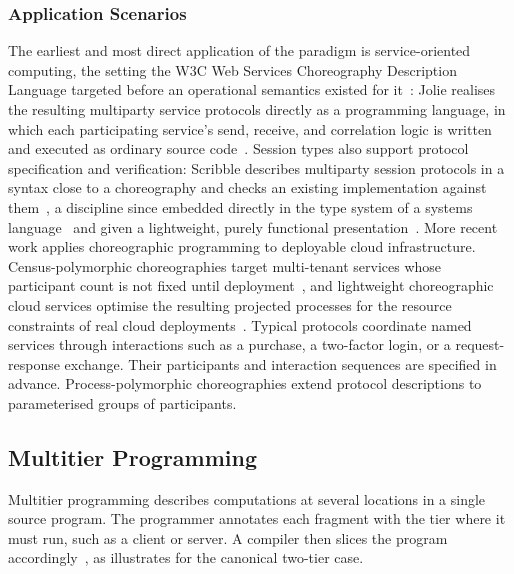\subsubsection{Application Scenarios}
\label{subsubsec:chor-application-scenarios}

The earliest and most direct application of the paradigm is service-oriented computing,
the setting the W3C Web Services Choreography Description Language targeted before an operational semantics existed for it~\cite{WSCDL}:
Jolie realises the resulting multiparty service protocols directly as a programming language,
in which each participating service's send, receive, and correlation logic is written and executed as ordinary source code~\cite{DBLP:books/sp/wsf14/MontesiGZ14}.
%
Session types also support protocol specification and verification:
Scribble describes multiparty session protocols in a syntax close to a choreography and checks an existing implementation against them~\cite{DBLP:conf/icdcit/HondaMBCY11},
a discipline since embedded directly in the type system of a systems language~\cite{chen_et_al:LIPIcs.ECOOP.2022.22}
and given a lightweight, purely functional presentation~\cite{Lindley:2017}.
%
More recent work applies choreographic programming to deployable cloud infrastructure.
Census-polymorphic choreographies target multi-tenant services whose participant count is not fixed until deployment~\cite{DBLP:journals/pacmpl/BatesKJSKN25},
and lightweight choreographic cloud services optimise the resulting projected processes for the resource constraints of real cloud deployments~\cite{DBLP:conf/pepm/IonescuR26}.
%
Typical protocols coordinate named services through interactions such as a purchase,
a two-factor login,
or a request-response exchange.
%
Their participants and interaction sequences are specified in advance.
%
Process-polymorphic choreographies extend protocol descriptions to parameterised groups of participants.

\subsection{Multitier Programming}
\label{subsec:multitier-programming}

Multitier programming describes computations at several locations in a single source program.
%
The programmer annotates each fragment with the tier where it must run,
such as a client or server.
%
A compiler then slices the program accordingly~\cite{DBLP:journals/csur/WeisenburgerWS20},
as  illustrates for the canonical two-tier case.

